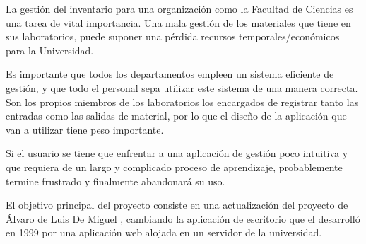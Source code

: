
La gestión del inventario para una organización como la Facultad de Ciencias es una tarea de vital importancia. Una mala gestión de los materiales que tiene en sus laboratorios, puede suponer una pérdida recursos temporales/económicos para la Universidad.

Es importante que todos los departamentos empleen un sistema eficiente de gestión, y que todo el personal sepa utilizar este sistema de una manera correcta. Son los propios miembros de los laboratorios los encargados de registrar tanto las entradas como las salidas de material, por lo que el diseño de la aplicación que van a utilizar tiene peso importante. 

Si el usuario se tiene que enfrentar a una aplicación de gestión poco intuitiva y que requiera de un largo y complicado proceso de aprendizaje, probablemente termine frustrado y finalmente abandonará su uso.

El objetivo principal del proyecto consiste en una actualización del proyecto de Álvaro de Luis De Miguel \cite{GeslabV1}, cambiando la aplicación de escritorio que el desarrolló en 1999 por una aplicación web alojada en un servidor de la universidad.
